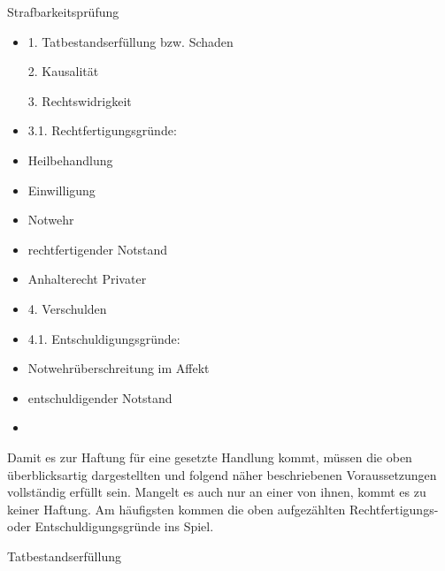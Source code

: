 \documentclass{article}
\begin{document}
Strafbarkeitspr\"ufung

\begin{itemize}
\item[] 1. Tatbestandserf\"ullung bzw. Schaden

2. Kausalit\"at

3. Rechtswidrigkeit

\end{itemize}
\begin{itemize}
\item[] 3.1. Rechtfertigungsgr\"unde:

\end{itemize}
\begin{itemize}
\item Heilbehandlung

\item Einwilligung

\item Notwehr

\item rechtfertigender Notstand

\item Anhalterecht Privater

\end{itemize}
\begin{itemize}
\item[] 4. Verschulden

\end{itemize}
\begin{itemize}
\item[] 4.1. Entschuldigungsgr\"unde:

\end{itemize}
\begin{itemize}
\item Notwehr\"uberschreitung im Affekt

\item entschuldigender Notstand

\item [Unzurechenbarkeit]

\end{itemize}
Damit es zur Haftung f\"ur eine gesetzte Handlung kommt, m\"ussen die
oben \"uberblicksartig dargestellten und folgend n\"aher beschriebenen
Voraussetzungen vollst\"andig erf\"ullt sein. Mangelt es auch nur an
einer von ihnen, kommt es zu keiner Haftung. Am h\"aufigsten kommen die
oben aufgez\"ahlten Rechtfertigungs- oder Entschuldigungsgr\"unde ins
Spiel.

Tatbestandserf\"ullung 
\end{document}
